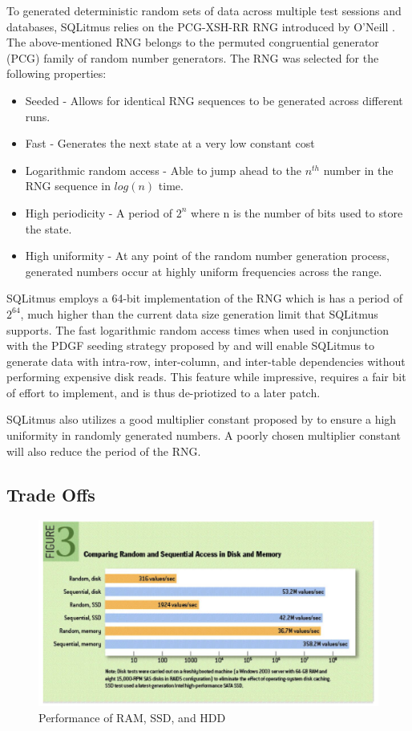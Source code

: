\documentclass[12pt]{article}
\begin{document}
\begin{spacing}{1.9}
		To generated deterministic random sets of data across multiple test sessions and databases, SQLitmus relies on the PCG-XSH-RR RNG introduced by O'Neill \cite{oneill:pcg2014}. The above-mentioned RNG belongs to the permuted congruential generator (PCG) family of random number generators. The RNG was selected for the following properties:
		\begin{itemize}
			\item Seeded - Allows for identical RNG sequences to be generated across different runs.
			\item Fast - Generates the next state at a very low constant cost
			\item Logarithmic random access - Able to jump ahead to the $n^{th}$ number in the RNG sequence in $log(n)$ time.
			\item High periodicity - A period of $2^n$ where n is the number of bits used to store the state.
			\item High uniformity - At any point of the random number generation process, generated numbers occur at highly uniform frequencies across the range.
		\end{itemize}
		
		
		SQLitmus employs a 64-bit implementation of the RNG which is has a period of $2^{64}$, much higher than the current data size generation limit that SQLitmus supports. The fast logarithmic random access times when used in conjunction with the PDGF seeding strategy proposed by \cite{Rabl:2010} and \cite{Alexandrov:2012} will enable SQLitmus to generate data with intra-row, inter-column, and inter-table dependencies without performing expensive disk reads. This feature while impressive, requires a fair bit of effort to implement, and is thus de-priotized to a later patch.
		
		SQLitmus also utilizes a good multiplier constant proposed by \cite{LEcuyer:1999} to ensure a high uniformity in randomly generated numbers. A poorly chosen multiplier constant will also reduce the period of the RNG. 
		
		
		\subsection{Trade Offs}
		
		\begin{figure}[H]
			\centering
			\includegraphics[width=\textwidth]{2-3-4.png}
			\caption{Performance of RAM, SSD, and HDD \cite{Jacobs:2009}}
			

\end{figure}
\end{spacing}
\end{document}
